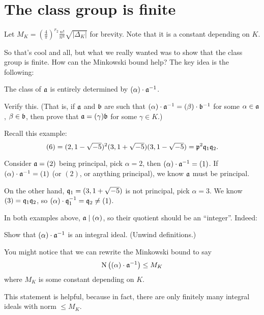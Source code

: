 \section{The class group is finite}
\begin{definition}
	Let
	$M_K = \left( \frac 4\pi \right)^{r_2} \frac{n!}{n^n} \sqrt{\left\lvert \Delta_K \right\rvert}$
	for brevity.
	Note that it is a constant depending on $K$.
\end{definition}
So that's cool and all, but what we really wanted was to show that
the class group is finite.
How can the Minkowski bound help?
The key idea is the following:
\begin{moral}
	The class of $\mathfrak a$ is entirely determined by $(\alpha) \cdot \mathfrak a^{-1}$.
\end{moral}
\begin{ques}
	Verify this. (That is, if $\mathfrak a$ and $\mathfrak b$ are such that $(\alpha) \cdot \mathfrak a^{-1} = (\beta) \cdot
	\mathfrak b^{-1}$ for some $\alpha \in \mathfrak a$, $\beta \in \mathfrak b$, then prove that $\mathfrak a = (\gamma) \mathfrak b$
	for some $\gamma \in K$.)
\end{ques}

\begin{example}
	Recall this example:
	\[
		(6)
		= (2,1-\sqrt{-5})^2 (3,1+\sqrt{-5})(3,1-\sqrt{-5})
		= \mathfrak p^2 \mathfrak q_1 \mathfrak q_2. \]

	Consider $\mathfrak a = (2)$ being principal, pick $\alpha = 2$, then $(\alpha) \cdot \mathfrak a^{-1} = (1)$.
	If $(\alpha) \cdot \mathfrak a^{-1} = (1)$ (or $(2)$, or anything principal), we know $\mathfrak a$ must be
	principal.

	On the other hand, $\mathfrak q_1 = (3,1+\sqrt{-5})$ is not principal,
	pick $\alpha = 3$.
	We know $(3) = \mathfrak q_1 \mathfrak q_2$, so $(\alpha) \cdot \mathfrak q_1^{-1} = \mathfrak q_2 \neq (1)$.
\end{example}

In both examples above, $\mathfrak a \mid (\alpha)$, so their quotient should be an ``integer''. Indeed:
\begin{ques}
	Show that $(\alpha) \cdot \mathfrak a^{-1}$ is an integral ideal.
	(Unwind definitions.)
\end{ques}

You might notice that we can rewrite the Minkowski bound to say
\[ \operatorname{N}\left( (\alpha) \cdot \mathfrak a^{-1} \right) \le M_K \]
where $M_K$ is some constant depending on $K$.

This statement is helpful, because in fact, there are only finitely many integral ideals
with norm $\leq M_K$.

